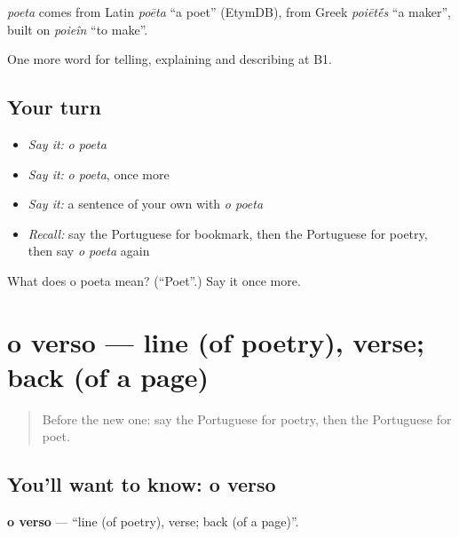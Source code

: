 \begin{cousinweb}
\emph{poeta} comes from Latin \emph{poēta} \textquotedblleft{}a poet\textquotedblright{} (EtymDB), from Greek \emph{poiēt\'{\={e}}s} \textquotedblleft{}a maker\textquotedblright{}, built on \emph{poieîn} \textquotedblleft{}to make\textquotedblright{}.
\end{cousinweb}

\begin{grammarlens}[title={What you've built}]
One more word for telling, explaining and describing at B1.
\end{grammarlens}

\subsection*{Your turn}
\begin{itemize}
\raggedright
  \item \emph{Say it:} \emph{o poeta}
  \item \emph{Say it:} \emph{o poeta}, once more
  \item \emph{Say it:} a sentence of your own with \emph{o poeta}
  \item \emph{Recall:} say the Portuguese for bookmark, then the Portuguese for poetry, then say \emph{o poeta} again
\end{itemize}

\begin{tcolorbox}[breakable,colback=teal!4,colframe=teal!35!black,title={Before you move on}]
What does o poeta mean? (\textquotedblleft{}Poet\textquotedblright{}.) Say it once more.
\end{tcolorbox}
\section[o verso]{o verso — line (of poetry), verse; back (of a page)}

\label{lesson:PT-C524-verso}



\begin{quote}
Before the new one: say the Portuguese for poetry, then the Portuguese for poet.
\end{quote}

\subsection*{You'll want to know: o verso}
\textbf{o verso} — \textquotedblleft{}line (of poetry), verse; back (of a page)\textquotedblright{}.


